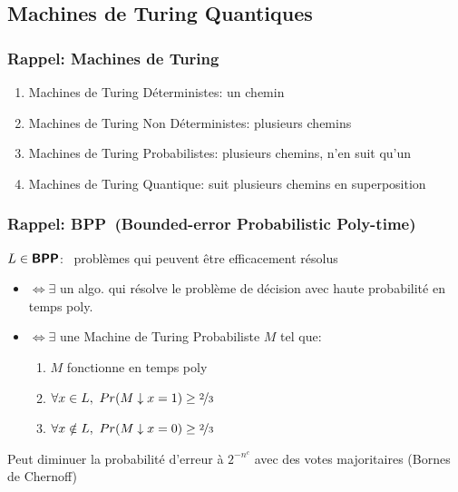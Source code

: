 \documentclass{beamer}
\newcommand{\bpp}{\textsf{\textbf{BPP}}}
\begin{document}
\subsection{Machines de Turing Quantiques}

\begin{frame}
  \frametitle{Rappel: Machines de Turing}

  \begin{enumerate}
    \item Machines de Turing D\'eterministes: un chemin
    \item Machines de Turing Non D\'eterministes: plusieurs chemins
    \item Machines de Turing Probabilistes: plusieurs chemins, n'en suit qu'un
    \item Machines de Turing Quantique: \pause
          suit plusieurs chemins en superposition
  \end{enumerate}
\end{frame}

\begin{frame}
  \frametitle{Rappel: \bpp \ (Bounded-error Probabilistic Poly-time)}

  $L \in \bpp$: \ probl\`emes qui peuvent \^etre efficacement r\'esolus
  \begin{itemize}
    \item $\iff \exists$ un algo. qui r\'esolve le probl\`eme de d\'ecision avec haute probabilit\'e en temps poly.
    \item $\iff \exists$ une Machine de Turing Probabiliste $M$ tel que:
          \begin{enumerate}
            \item $M$ fonctionne en temps poly
            \item $\forall x \in L,\ Pr(M \downarrow x = 1) \geq \nicefrac{2}{3}$
            \item $\forall x \notin L,\ Pr(M \downarrow x = 0) \geq \nicefrac{2}{3}$
          \end{enumerate}
  \end{itemize}

  Peut diminuer la probabilit\'e d'erreur \`a $2^{-n^c}$ avec des votes majoritaires (Bornes de Chernoff)
\end{frame}
\end{document}
